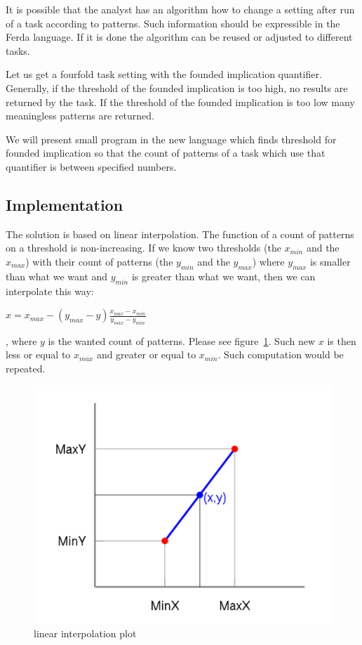 \documentclass[a4paper,12pt]{book}
\begin{document}
It is possible that the analyst has an algorithm how to change a setting after run of a task according to patterns. Such information should be expressible in the Ferda language. If it is done the algorithm can be reused or adjusted to different tasks.

Let us get a fourfold task setting with the founded implication quantifier. Generally, if the threshold of the founded implication is too high, no results are returned by the task. If the threshold of the founded implication is too low many meaningless patterns are returned.

We will present small program in the new language which finds threshold for founded implication so that the count of patterns of a task which use that quantifier is between specified numbers.

\subsection{Implementation}
The solution is based on linear interpolation. The function of a count of patterns on a threshold is non-increasing. If we know two thresholds (the $x_{min}$ and the $x_{max}$) with their count of patterns (the $y_{min}$ and the $y_{max}$) where $y_{max}$ is smaller than what we want and $y_{min}$ is greater than what we want, then we can interpolate this way: 

\begin{math}
x = x_{max} - (y_{max} - y)\frac{x_{max} - x_{min}}{y_{max} - y_{min}}
\end{math}

, where $y$ is the wanted count of patterns. Please see figure~\ref{fig:linearInterpolationPlot}. Such new $x$ is then less or equal to $x_{max}$ and greater or equal to $x_{min}$. Such computation would be repeated.

\begin{figure}
	\includegraphics[width=1\textwidth]{linearInterpolationPlot}
	\caption{linear interpolation plot}
	\label{fig:linearInterpolationPlot}
\end{figure}
\end{document}
